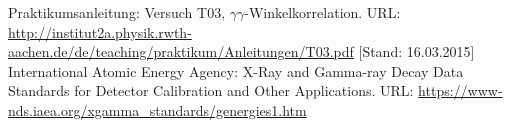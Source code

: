 \documentclass{../Misc/MontavonLaTeX/Montavon}
\begin{document}
\newpage
\begin{thebibliography}{xxxx}
 Praktikumsanleitung: Versuch T03, $\gamma \gamma$-Winkelkorrelation. URL: \url{http://institut2a.physik.rwth-aachen.de/de/teaching/praktikum/Anleitungen/T03.pdf} [Stand: 16.03.2015]
 International Atomic Energy Agency: X-Ray and Gamma-ray Decay Data Standards for Detector Calibration and Other Applications. URL: \url{https://www-nds.iaea.org/xgamma_standards/genergies1.htm}
\end{thebibliography}
\end{document}
